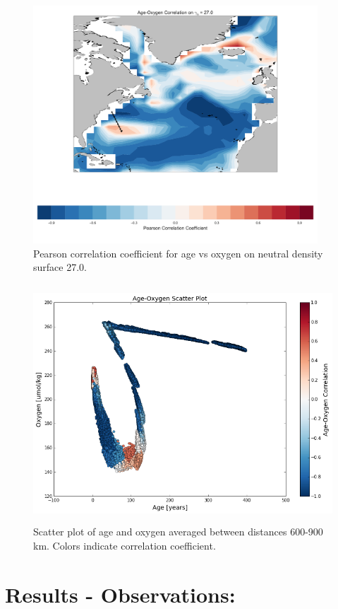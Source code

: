 \documentclass[11pt]{article}
\begin{document}
\clearpage

\begin{figure}[t!]
    \centering
    \includegraphics[height=3.5in]{correlation_on_27.pdf}
    \caption{Pearson correlation coefficient for age vs oxygen on neutral density
    surface 27.0.}
\end{figure}

\begin{figure}[b!]
    \centering
    \includegraphics[height=3.5in]{Age-Oxygen_scatter.png}
    \caption{Scatter plot of age and oxygen averaged between distances 600-900 km.
    Colors indicate correlation coefficient. }
\end{figure}

\section*{Results - Observations:}
\end{document}
